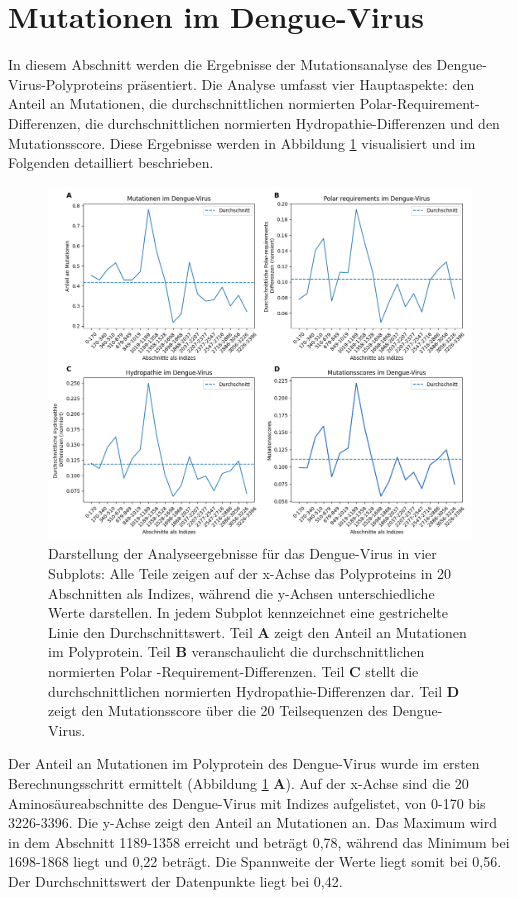 \documentclass[german,version-2022-01]{uzl-thesis}
\begin{document}
\section{Mutationen im Dengue-Virus}
In diesem Abschnitt werden die Ergebnisse der Mutationsanalyse des Dengue-Virus-Polyproteins pr\"asentiert. Die Analyse umfasst vier Hauptaspekte: den Anteil an Mutationen, die durchschnittlichen normierten Polar-Requirement-Differenzen, die durchschnittlichen normierten Hydropathie-Differenzen und den Mutationsscore. Diese Ergebnisse werden in Abbildung \ref{fig:Dengue_virus_combined} visualisiert und im Folgenden detailliert beschrieben.
\begin{figure}[tbp]
  \centering
  \includegraphics[scale=0.36]{Images/Diagramm_combined_pictures_Dengue_virus.png}
  \caption{Darstellung der Analyseergebnisse f\"ur das Dengue-Virus in vier Subplots: Alle Teile zeigen auf der x-Achse das Polyproteins in 20 Abschnitten als Indizes, w\"ahrend die y-Achsen unterschiedliche Werte darstellen. In jedem Subplot kennzeichnet eine gestrichelte Linie den Durchschnittswert. Teil \textbf{A} zeigt den Anteil an Mutationen im Polyprotein. Teil \textbf{B} veranschaulicht die durchschnittlichen normierten Polar
  -Requirement-Differenzen. Teil \textbf{C} stellt die durchschnittlichen normierten Hydropathie-Differenzen dar. Teil \textbf{D} zeigt den Mutationsscore \"uber die 20 Teilsequenzen des Dengue-Virus.}
  \label{fig:Dengue_virus_combined}
\end{figure}

Der Anteil an Mutationen im Polyprotein des Dengue-Virus wurde im ersten Berechnungsschritt ermittelt (Abbildung \ref{fig:Dengue_virus_combined} \textbf{A}). Auf der x-Achse sind die 20 Aminos\"aureabschnitte des Dengue-Virus mit Indizes aufgelistet, von 0-170 bis 3226-3396. Die y-Achse zeigt den Anteil an Mutationen an. Das Maximum wird in dem Abschnitt 1189-1358 erreicht und betr\"agt 0,78, w\"ahrend das Minimum bei 1698-1868 liegt und 0,22 betr\"agt. Die Spannweite der Werte liegt somit bei 0,56. Der Durchschnittswert der Datenpunkte liegt bei 0,42. 
\end{document}
